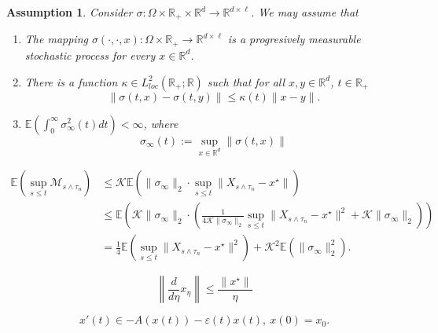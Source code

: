 \documentclass[10pt,a4paper]{amsart}
\newtheorem{assumption}{Assumption}
\newcommand{\R}{\mathbb{R}}
\renewcommand{\epsilon}{\varepsilon}
\begin{document}
 \begin{assumption}\label{assumption01}
    Consider $\sigma \colon \Omega \times \R_+ \times \mathbb{R}^d \to \mathbb{R}^{d\times \ell}$. We may assume that 
\begin{enumerate}[label=\alph*)]
    \item The mapping $\sigma (\cdot,\cdot,  x): \Omega\times \R_+   \to \mathbb{R}^{d\times \ell}$ is a progresively measurable stochastic process for every $x\in \mathbb{R}^d$.
    \item  There is a function $\kappa\in L^2_{loc}(\R_+;\R)$ such that for all $x,y\in \R^d$, $t\in \R_+$
    \begin{equation*} 
        \|\sigma(t,x)-\sigma(t,y)\|\leq \kappa(t)\|x-y\|.
    \end{equation*}
    \item $\mathbb{E} \left( \int_0^\infty  \sigma^2_\infty (t)  dt\right)  < \infty$, where $$ \sigma_\infty(t) := \sup_{x\in \R^d}\|\sigma(t,x)\| $$
    \end{enumerate}
 \end{assumption}

    \begin{equation}\label{eqBDG}
        \begin{aligned}
            \mathbb{E}(\sup_{s\leq t}\mathscr{M}_{s\wedge\tau_n}) &\leq \mathcal{K}\mathbb{E}(\|\sigma_\infty\|_2\cdot \sup_{s\leq t}\|X_{s\wedge\tau_n}-x^\star\|)\\
            &\leq \mathbb{E}\left(\mathcal{K}\|\sigma_\infty\|_2\cdot \left(\frac{1}{4 \mathcal{K}\|\sigma_\infty\|_2}\sup_{s\leq t}\|X_{s\wedge\tau_n}-x^\star\|^2 + \mathcal{K}\|\sigma_\infty\|_2\right)\right)\\
            &=\frac{1}{4}\mathbb{E}\left(\sup_{s\leq t}\|X_{s\wedge\tau_n}-x^\star\|^2\right) + \mathcal{K}^2\mathbb{E}\left(\|\sigma_\infty\|_2^2\right).
        \end{aligned}
    \end{equation}

\begin{equation}\label{bound-derivative-curve1}
    \left\|\frac{d}{d\eta} x_\eta\right\| \leq \frac{\|x^\star\|}{\eta}
\end{equation}

\begin{equation}\label{eqn_tikhonov-deterministic}
    x'(t)\in -A(x(t)) - \epsilon(t)x(t), \ x(0) = x_0.
\end{equation}
\end{document}
